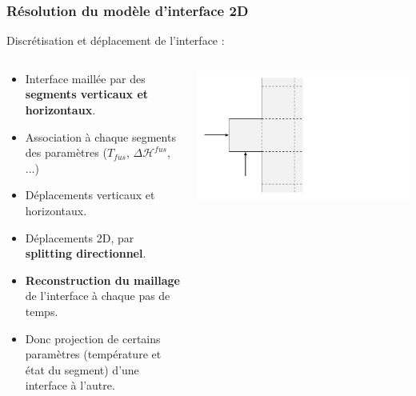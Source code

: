 \documentclass{beamer}
\begin{document}
\begin{frame}
    \frametitle{Résolution du modèle d'interface 2D}
    \footnotesize
	\begin{ceablock}{Discrétisation et déplacement de l'interface :}
	\begin{columns}[c]
	\begin{column}{0.7\textwidth}
	\begin{itemize}
		\item Interface maillée par des \textbf{segments verticaux et horizontaux}.\\
        \item Association à chaque segments des paramètres ($T_{fus}$, $\Delta \mathcal{H}^{fus}$, ...)\\
        \item Déplacements verticaux et horizontaux.\\
        \item Déplacements 2D, par \textbf{splitting directionnel}.\\
        \item \textbf{Reconstruction du maillage} de l'interface à chaque pas de temps.\\
        \item Donc projection de certains paramètres (température et état du segment) d'une interface à l'autre.
	\end{itemize}
	
	\end{column}
	\begin{column}{0.3\textwidth}
	\begin{center}
		\includegraphics[width=1.55\textwidth]{Figures/interface.pdf}
	\end{center}

	\end{column}

	\end{columns}
	\center {}
		\end{ceablock}
	\end{frame}
	
\end{document}
